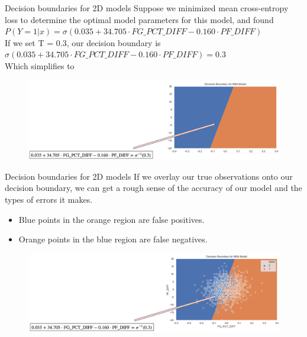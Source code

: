 \documentclass[aspectratio=169]{../latex_main/tntbeamer}  %
\begin{document}
	\begin{frame}{Decision boundaries for 2D models}
	Suppose we minimized mean cross-entropy loss to determine the optimal model parameters for this model, and found\\
	$P(Y=1|x) = \sigma (0.035 + 34.705\cdot FG\_PCT\_DIFF - 0.160\cdot PF\_DIFF)$\\
	\bigskip
	If we set T = 0.3, our decision boundary is \\
	$\sigma (0.035 + 34.705\cdot FG\_PCT\_DIFF - 0.160\cdot PF\_DIFF) = 0.3$\\
	\bigskip
	Which simplifies to
	
        \begin{figure}
            \centering
            \includegraphics[scale=.25]{Bild38}
        \end{figure}
	     
	\end{frame}
	
	
	\begin{frame}{Decision boundaries for 2D models}
	If we overlay our true observations onto our decision boundary, we can get a rough sense of the accuracy of our model and the types of errors it makes.\\
	\begin{itemize}
	    \item Blue points in the orange region are false positives.
	    \item Orange points in the blue region are false negatives.
	\end{itemize}
	
        \begin{figure}
            \centering
            \includegraphics[scale=.35]{Bild39}
        \end{figure}
	     
	\end{frame}
	
	
\end{document}
